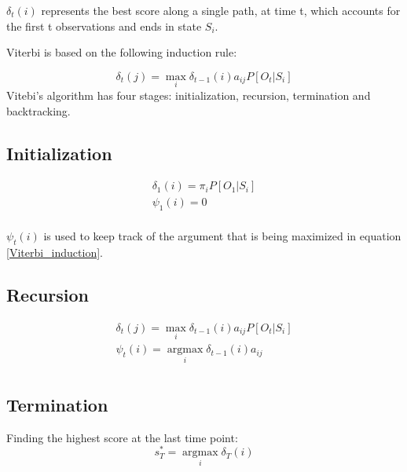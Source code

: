 \documentclass[12pt]{article}
\begin{document}
${\delta _t}\left( i \right)$ represents the best score along a single path, at time t, which accounts for the first t observations and ends in state $S_i$.

Viterbi is based on the following induction rule:

\begin{equation}
\label{Viterbi_induction}
{\delta _t}\left( j \right) = \mathop {\max }\limits_i {\delta _{t - 1}}\left( i \right){a_{ij}}P\left[ {{O_t}|{S_i}} \right]
\end{equation}
Vitebi's algorithm has four stages: initialization, recursion, termination and backtracking.

\subsection{Initialization}
\begin{equation}
\label{init}
\begin{array}{l}
 {\delta _1}\left( i \right) = {\pi _i}P\left[ {{O_1}|{S_i}} \right] \\
 {\psi _1}\left( i \right) = 0 \\
 \end{array}
 \end{equation}


${\psi _t}\left( i \right)$ is used to keep track of the argument that is being maximized in equation \ref{Viterbi_induction}.

\subsection{Recursion}

\begin{equation}
\label{rec}
\begin{array}{l}
 {\delta _t}\left( j \right) = \mathop {\max }\limits_i {\delta _{t - 1}}\left( i \right){a_{ij}}P\left[ {{O_t}|{S_i}} \right] \\
 {\psi _t}\left( i \right) = \mathop {\arg \max }\limits_i {\delta _{t - 1}}\left( i \right){a_{ij}} \\
 \end{array}
 \end{equation}

\subsection{Termination}
Finding the highest score at the last time point:
\begin{equation}
\label{termination}
s_T^* = \mathop {\arg \max }\limits_i {\delta _T}\left( i \right)
 \end{equation}
\end{document}
